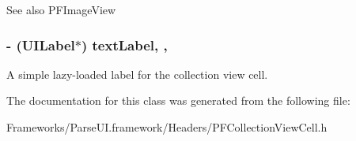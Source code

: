 \begin{DoxySeeAlso}{See also}
P\+F\+Image\+View 
\end{DoxySeeAlso}
\hypertarget{interface_p_f_collection_view_cell_a7b74bb02a74dc52ce87a7b6b45d9feaf}{}
\subsubsection[{text\+Label}]{\setlength{\rightskip}{0pt plus 5cm}-\/ (U\+I\+Label$\ast$) text\+Label\hspace{0.3cm}{\ttfamily [read]}, {\ttfamily [nonatomic]}, {\ttfamily [strong]}}\label{interface_p_f_collection_view_cell_a7b74bb02a74dc52ce87a7b6b45d9feaf}
A simple lazy-\/loaded label for the collection view cell. 

The documentation for this class was generated from the following file\+:\begin{DoxyCompactItemize}
\item 
Frameworks/\+Parse\+U\+I.\+framework/\+Headers/P\+F\+Collection\+View\+Cell.\+h\end{DoxyCompactItemize}
